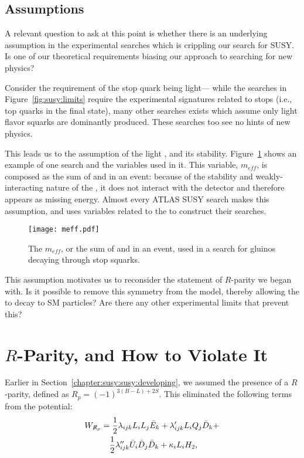 \subsection{Assumptions}

A relevant question to ask at this point is whether there is an underlying assumption in the experimental searches which is crippling our search for SUSY. Is one of our theoretical requirements biasing our approach to searching for new physics?

Consider the requirement of the stop quark being light--- while the searches in Figure~\ref{fig:susy:limits} require the experimental signatures related to stops (i.e., top quarks in the final state), many other searches exists which assume only light flavor squarks are dominantly produced. These searches too see no hints of new physics.

This leads us to the assumption of the light \lsp, and its stability. Figure~\ref{fig:susy:meff} shows an example of one search and the variables used in it. This variable, $m_{eff}$, is composed as the sum of \met and \Ht in an event: because of the stability and weakly-interacting nature of the \lsp, it does not interact with the detector and therefore appears as missing energy. Almost every ATLAS SUSY search makes this assumption, and uses variables related to the \met to construct their searches. 
 

\begin{figure}
\centering
\texttt{[image: meff.pdf]}
\label{fig:susy:meff}
\caption{The $m_{eff}$, or the sum of \met and \Ht in an event, used in a search for gluinos decaying through stop squarks.}
\end{figure}


This assumption motivates us to reconsider the statement of $R$-parity we began with. Is it possible to remove this symmetry from the model, thereby allowing the \lsp to decay to SM particles? Are there any other experimental limits that prevent this? 

\section{$R$-Parity, and How to Violate It}
\label{chapter:susy:r}
Earlier in Section~\ref{chapter:susy:susy:developing}, we assumed the presence of a $R$-parity, defined as $R_p = (-1)^{3(B-L)+2S}$. This eliminated the following terms from the potential\cite{dreinerRPV}:
%
  \begin{eqnarray} 
    W_{\not R_p} &= \frac{1}{2} \lambda_{ijk} L_{i}L_{j}\bar E_{k} + \lambda_{ijk}^{\prime} L_{i}Q_{j}\bar D_{k} +  \nonumber \\
       & \quad \frac{1}{2}\lambda_{ijk}^{\prime\prime}\bar U_{i}\bar D_{j}\bar D_{k} + \kappa_iL_{i}H_{2},
    \label{eqn:rpvandudd:wrpv}
  \end{eqnarray} 

